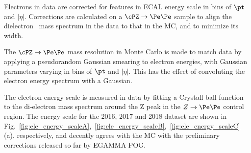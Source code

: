 Electrons in data are corrected for features in ECAL energy scale
in bins of $\pt$ and $\left| \eta \right|$. Corrections are calculated
on a $\cPZ \to \Pe\Pe$ sample to align the dielectron 
mass spectrum in the data to that in the MC, and to
minimize its width.

The $\cPZ \to \Pe\Pe$ mass resolution in Monte Carlo is made to match
data by applying a pseudorandom Gaussian smearing to electron energies,
with Gaussian parameters varying in bins of $\pt$ and $\left| \eta \right|$.
This has the effect of convoluting the electron energy spectrum with a
Gaussian.

The electron energy scale is measured in data by fitting a Crystall-ball function to the di-electron mass spectrum around the Z peak in the $Z\rightarrow \Pe \Pe$ control region. The energy scale for the 2016, 2017 and 2018 dataset are shown in Fig.~\ref{fig:ele_energy_scaleA},~\ref{fig:ele_energy_scaleB},~\ref{fig:ele_energy_scaleC} (a), respectively, and decently agrees with the MC with the preliminary corrections released so far by EGAMMA POG. %

